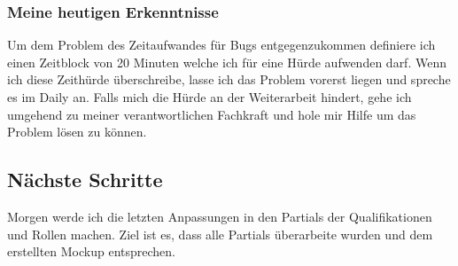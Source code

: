 \subsubsection*{Meine heutigen Erkenntnisse}
Um dem Problem des Zeitaufwandes für Bugs entgegenzukommen definiere ich einen Zeitblock von 20 Minuten welche ich für eine Hürde aufwenden darf. 
Wenn ich diese Zeithürde überschreibe, lasse ich das Problem vorerst liegen und spreche es im Daily an. Falls mich die Hürde an der Weiterarbeit hindert, 
gehe ich umgehend zu meiner verantwortlichen Fachkraft und hole mir Hilfe um das Problem lösen zu können.

\subsection*{Nächste Schritte}
Morgen werde ich die letzten Anpassungen in den Partials der Qualifikationen und Rollen machen. Ziel ist es, dass
alle Partials überarbeite wurden und dem erstellten Mockup entsprechen.

\pagebreak
